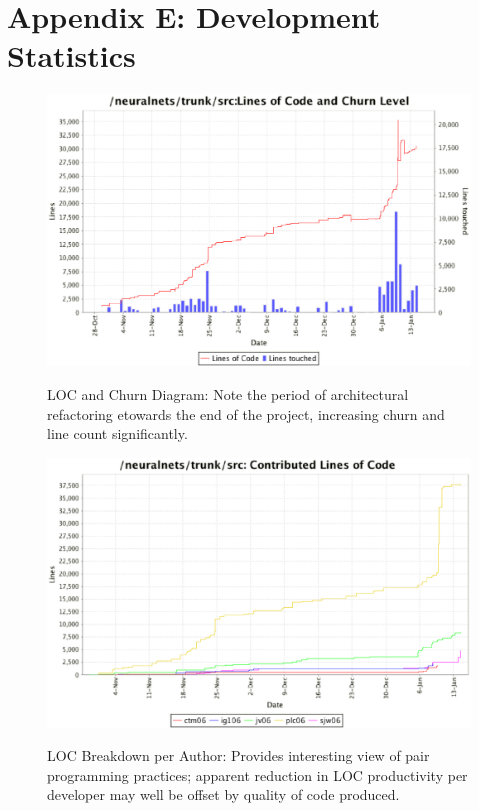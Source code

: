 \documentclass[11pt]{report}
\begin{document}
\newpage
\section{Appendix E: Development Statistics}
{
\begin{figure}[h]
\centering
\scalebox{0.6} {
	\includegraphics{locandchurn}
}
\caption{LOC and Churn Diagram: Note the period of architectural refactoring etowards the end of the project, increasing churn and line count significantly.}
\label{fig:gui}
\end{figure}

\begin{figure}[h]
\centering
\scalebox{0.6} {
	\includegraphics{locperauthor}
}
\caption{LOC Breakdown per Author: Provides interesting view of pair programming practices; apparent reduction in LOC productivity per developer may well be offset by quality of code produced.}
\label{fig:util}
\end{figure}

}
\end{document}
